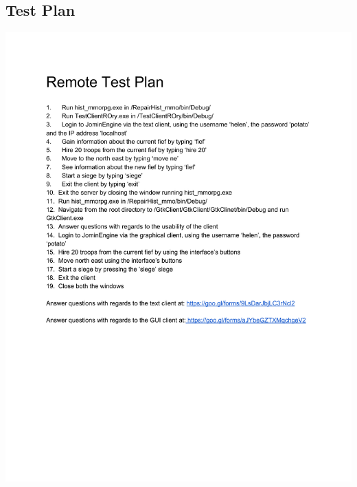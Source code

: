 \documentclass{article}
\begin{document}
	\subsection{Test Plan}
	\includegraphics{RemoteTestPlanNonTechnical.pdf} 
\end{document}
